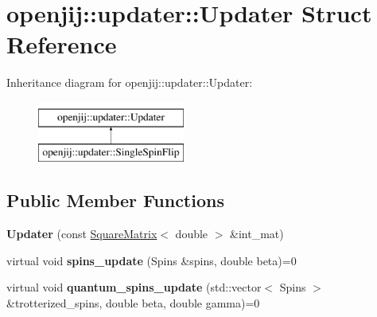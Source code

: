 \hypertarget{structopenjij_1_1updater_1_1_updater}{}\section{openjij\+::updater\+::Updater Struct Reference}
\label{structopenjij_1_1updater_1_1_updater}
Inheritance diagram for openjij\+::updater\+::Updater\+:\begin{figure}[H]
\begin{center}
\leavevmode
\includegraphics[height=2.000000cm]{structopenjij_1_1updater_1_1_updater}
\end{center}
\end{figure}
\subsection*{Public Member Functions}
\begin{DoxyCompactItemize}
\item 
\mbox{\label{structopenjij_1_1updater_1_1_updater_a92a1aba09a5604c300350ffd4dfa544d}} 
{\bfseries Updater} (const \mbox{\hyperlink{structopenjij_1_1_square_matrix}{Square\+Matrix}}$<$ double $>$ \&int\+\_\+mat)
\item 
\mbox{\label{structopenjij_1_1updater_1_1_updater_a5824c1c2091670658bdb3188137d1575}} 
virtual void {\bfseries spins\+\_\+update} (Spins \&spins, double beta)=0
\item 
\mbox{\label{structopenjij_1_1updater_1_1_updater_af18bd04eeac0a00d5cc435aa03f89dff}} 
virtual void {\bfseries quantum\+\_\+spins\+\_\+update} (std\+::vector$<$ Spins $>$ \&trotterized\+\_\+spins, double beta, double gamma)=0
\end{DoxyCompactItemize}
